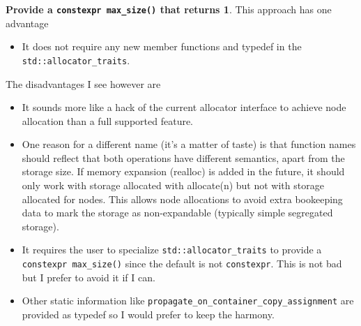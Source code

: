 \documentclass[11pt]{article}
\begin{document}
\medskip
\noindent
{\bf Provide a \texttt{constexpr max\_size()} that returns 1}. This approach has one advantage

\begin{itemize}
\item It does not require any new member functions and typedef in the
\texttt{std::allocator\_traits}.
\end{itemize}

The disadvantages I see however are

\begin{itemize}
\item It sounds more like a hack of the current allocator interface to achieve
node allocation than a full supported feature.

\item One reason for a different name (it's a matter of taste) is that function
names should reflect that both operations have different semantics, apart from
the storage size. If memory expansion (realloc) is added in the future, it
should only work with storage allocated with allocate(n) but not with storage
allocated for nodes. This allows node allocations to avoid extra bookeeping
data to mark the storage as non-expandable (typically simple segregated
storage).

\item It requires the user to specialize \texttt{std::allocator\_traits} to
provide a \texttt{constexpr max\_size()} since the default is not
\texttt{constexpr}. This is not bad but I prefer to avoid it if I can.

\item Other static information like \texttt{propagate\_on\_container\_copy\_assignment}
are provided as typedef so I would prefer to keep the harmony.


\end{itemize}
\end{document}
